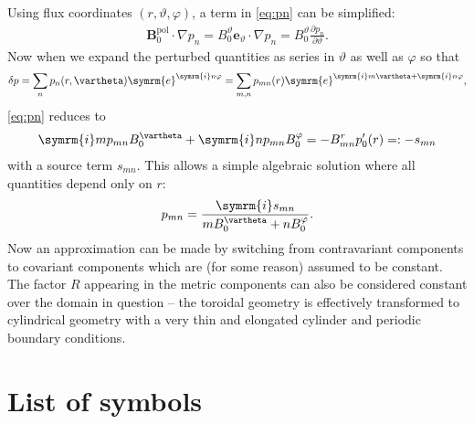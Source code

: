 \documentclass[a4paper, 10pt, english]{article}
\let\temp\varrho
\let\varrho\rho
\let\rho\temp
\let\temp\vartheta
\let\vartheta\theta
\let\theta\temp
\let\temp\varphi
\let\varphi\phi
\let\phi\temp
\let\vec\symbf
\newcommand*\e{\ensuremath{\symrm{e}}}  %
\newcommand*\im{\ensuremath{\symrm{i}}}  %
\newcommand*\pd[2][]{\ensuremath{\frac{\partial #1}{\partial #2}}}  %
\newcommand*\pol{\ensuremath{\textrm{pol}}}  %
\begin{document}
Using flux coordinates $(r, \theta, \phi)$, a term in \cref{eq:pn} can be simplified:
\begin{gather}
  \vec{B}_{0}^{\pol} \cdot \nabla p_{n} = B_{0}^{\theta} \vec{e}_{\theta} \cdot \nabla p_{n} = B_{0}^{\theta} \pd[p_{n}]{\theta}.
\end{gather}
Now when we expand the perturbed quantities as series in $\theta$ as well as $\phi$ so that
\begin{gather}
  \delta p = \sum_{n} p_n(r, \theta) \e^{\im n \phi} = \sum_{m, n} p_{mn}(r) \e^{\im m \theta + \im n \phi},
\end{gather}
\cref{eq:pn} reduces to
\begin{gather}
  \im m p_{mn} B_{0}^{\theta} + \im n p_{mn} B_{0}^{\phi} = -B_{mn}^{r} p_{0}'(r) =: -s_{mn}
\end{gather}
with a source term $s_{mn}$. This allows a simple algebraic solution where all quantities depend only on $r$:
\begin{gather}
  p_{mn} =  \frac{\im s_{mn}}{m B_{0}^{\theta} + n B_{0}^{\phi}}.
\end{gather}
Now an approximation can be made by switching from contravariant components to covariant components which are (for some reason) assumed to be constant. The factor $R$ appearing in the metric components can also be considered constant over the domain in question -- the toroidal geometry is effectively transformed to cylindrical geometry with a very thin and elongated cylinder and periodic boundary conditions.

\appendix
\section{List of symbols}
\end{document}
